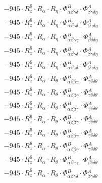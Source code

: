 \documentclass{article}
\begin{document}
\begin{subequations}
\begin{gather}
\begin{array}{c}
 \\[0.2em] 		 - 945 \cdot R_{z}^{6} \cdot R_{\alpha{}} \cdot R_{\eta{}} \cdot \Phi{}^{B}_{\alpha{}\beta{}\gamma{}\delta{}} \cdot \Phi{}^{A}_{\beta{}\gamma{}\delta{}\eta{}} 
 \\[0.2em] 		 - 945 \cdot R_{z}^{6} \cdot R_{\alpha{}} \cdot R_{\eta{}} \cdot \Phi{}^{B}_{\alpha{}\beta{}\gamma{}\delta{}} \cdot \Phi{}^{A}_{\beta{}\gamma{}\delta{}\eta{}} 
 \\[0.2em] 		 - 945 \cdot R_{z}^{6} \cdot R_{\alpha{}} \cdot R_{\eta{}} \cdot \Phi{}^{B}_{\alpha{}\beta{}\gamma{}\gamma{}} \cdot \Phi{}^{A}_{\beta{}\delta{}\delta{}\eta{}} 
 \\[0.2em] 		 - 945 \cdot R_{z}^{6} \cdot R_{\alpha{}} \cdot R_{\eta{}} \cdot \Phi{}^{B}_{\alpha{}\beta{}\gamma{}\delta{}} \cdot \Phi{}^{A}_{\beta{}\gamma{}\delta{}\eta{}} 
 \\[0.2em] 		 - 945 \cdot R_{z}^{6} \cdot R_{\alpha{}} \cdot R_{\eta{}} \cdot \Phi{}^{B}_{\alpha{}\beta{}\gamma{}\delta{}} \cdot \Phi{}^{A}_{\beta{}\gamma{}\delta{}\eta{}} 
 \\[0.2em] 		 - 945 \cdot R_{z}^{6} \cdot R_{\alpha{}} \cdot R_{\theta{}} \cdot \Phi{}^{B}_{\alpha{}\beta{}\beta{}\gamma{}} \cdot \Phi{}^{A}_{\gamma{}\delta{}\delta{}\theta{}} 
 \\[0.2em] 		 - 945 \cdot R_{z}^{6} \cdot R_{\alpha{}} \cdot R_{\theta{}} \cdot \Phi{}^{B}_{\alpha{}\beta{}\beta{}\gamma{}} \cdot \Phi{}^{A}_{\gamma{}\delta{}\delta{}\theta{}} 
 \\[0.2em] 		 - 945 \cdot R_{z}^{6} \cdot R_{\alpha{}} \cdot R_{\theta{}} \cdot \Phi{}^{B}_{\alpha{}\beta{}\beta{}\gamma{}} \cdot \Phi{}^{A}_{\gamma{}\delta{}\delta{}\theta{}} 
 \\[0.2em] 		 - 945 \cdot R_{z}^{6} \cdot R_{\alpha{}} \cdot R_{\theta{}} \cdot \Phi{}^{B}_{\alpha{}\beta{}\beta{}\gamma{}} \cdot \Phi{}^{A}_{\gamma{}\delta{}\delta{}\theta{}} 
 \\[0.2em] 		 - 945 \cdot R_{z}^{6} \cdot R_{\alpha{}} \cdot R_{\theta{}} \cdot \Phi{}^{B}_{\alpha{}\beta{}\beta{}\gamma{}} \cdot \Phi{}^{A}_{\gamma{}\delta{}\delta{}\theta{}} 
 \\[0.2em] 		 - 945 \cdot R_{z}^{6} \cdot R_{\alpha{}} \cdot R_{\theta{}} \cdot \Phi{}^{B}_{\alpha{}\beta{}\beta{}\gamma{}} \cdot \Phi{}^{A}_{\gamma{}\delta{}\delta{}\theta{}} 
 \\[0.2em] 		 - 945 \cdot R_{z}^{6} \cdot R_{\alpha{}} \cdot R_{\theta{}} \cdot \Phi{}^{B}_{\alpha{}\beta{}\gamma{}\gamma{}} \cdot \Phi{}^{A}_{\beta{}\delta{}\delta{}\theta{}} 
 \\[0.2em] 		 - 945 \cdot R_{z}^{6} \cdot R_{\alpha{}} \cdot R_{\theta{}} \cdot \Phi{}^{B}_{\alpha{}\beta{}\gamma{}\delta{}} \cdot \Phi{}^{A}_{\beta{}\gamma{}\delta{}\theta{}} 

\end{array}
\end{gather}
\end{subequations}
\end{document}
